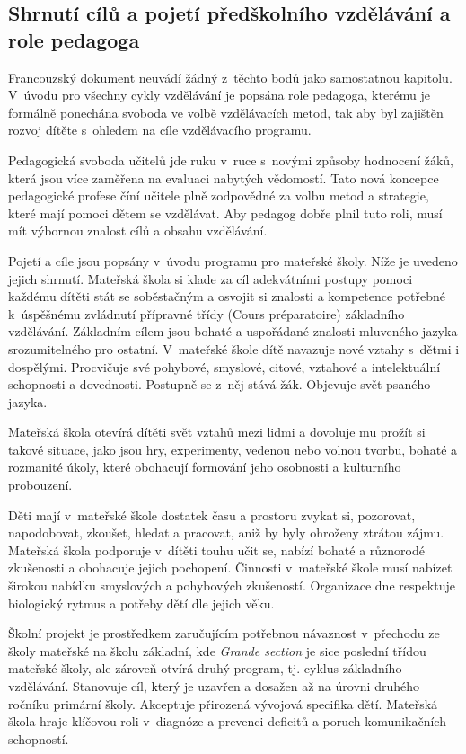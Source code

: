 \subsection{Shrnutí cílů a pojetí předškolního vzdělávání a role pedagoga}

	Francouzský dokument neuvádí žádný z~těchto bodů jako samostatnou kapitolu. V~úvodu pro všechny cykly vzdělávání je popsána role pedagoga, kterému je formálně ponechána svoboda ve volbě vzdělávacích metod, tak aby byl zajištěn rozvoj dítěte s~ohledem na cíle vzdělávacího programu.

	Pedagogická svoboda učitelů jde ruku v~ruce s~novými způsoby hodnocení žáků, která jsou více zaměřena na evaluaci nabytých vědomostí. Tato nová koncepce pedagogické profese číní učitele  plně zodpovědné za volbu metod a strategie, které mají pomoci dětem se vzdělávat. Aby pedagog dobře plnil tuto roli, musí mít výbornou znalost cílů a obsahu vzdělávání.

	Pojetí a cíle jsou popsány v~úvodu programu pro mateřské školy. Níže je uvedeno jejich shrnutí.
	Mateřská škola si klade za cíl adekvátními postupy pomoci každému dítěti stát se soběstačným a osvojit si znalosti a kompetence potřebné k úspěšnému zvládnutí přípravné třídy (Cours préparatoire) základního vzdělávání. Základním cílem jsou bohaté a uspořádané znalosti mluveného jazyka srozumitelného pro ostatní. V mateřské škole dítě navazuje nové vztahy s dětmi i dospělými. Procvičuje své pohybové, smyslové, citové, vztahové a intelektuální schopnosti a dovednosti. Postupně se z něj stává žák. Objevuje svět psaného jazyka. 

	Mateřská škola otevírá dítěti svět vztahů mezi lidmi a dovoluje mu prožít si takové situace, jako jsou hry, experimenty, vedenou nebo volnou tvorbu, bohaté a rozmanité úkoly, které obohacují formování jeho osobnosti a kulturního probouzení. 

	Děti mají v mateřské škole dostatek času a prostoru zvykat si, pozorovat, napodobovat, zkoušet, hledat a pracovat, aniž by byly ohroženy ztrátou zájmu. Mateřská škola podporuje v dítěti touhu učit se, nabízí bohaté a různorodé zkušenosti a obohacuje jejich pochopení. 
	Činnosti v mateřské škole musí nabízet širokou nabídku smyslových a pohybových zkušeností. Organizace dne respektuje biologický rytmus a potřeby dětí dle jejich věku. 

	Školní projekt je prostředkem zaručujícím potřebnou návaznost v~přechodu ze školy mateřské na školu základní, kde \textit{Grande section} je sice poslední třídou mateřské školy, ale zároveň otvírá druhý program, tj. cyklus základního vzdělávání. Stanovuje cíl, který je uzavřen a dosažen až na úrovni druhého ročníku primární školy. Akceptuje přirozená vývojová specifika dětí. Mateřská škola hraje klíčovou roli v diagnóze a prevenci deficitů a poruch komunikačních schopností.


